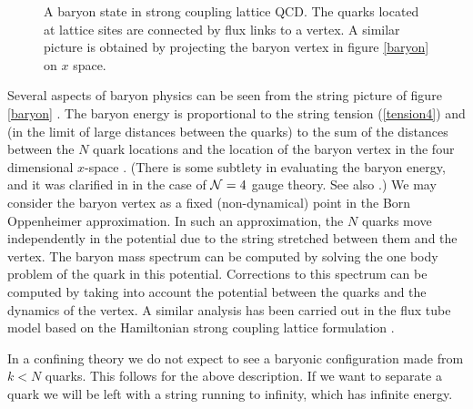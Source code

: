 \begin{figure}[htb]
\begin{center}
\epsfxsize=2in\leavevmode{}
\end{center}
\caption{A baryon state in strong coupling lattice QCD.
The quarks located at lattice sites 
are connected by flux links to a vertex. A similar picture is obtained
by projecting the baryon vertex in figure \ref{baryon} on $x$ space.}
\label{baryonlat}
\end{figure}

Several aspects of baryon physics can be seen from the string picture of
figure \ref{baryon} 
\cite{Witten:1998xy, Gross:1998gk}.
The baryon energy is proportional to the string tension (\ref{tension4})
and (in the limit of large distances between the quarks) to the sum of
the distances between the $N$ quark locations and the location of the
baryon vertex in the four dimensional $x$-space
\cite{Gross:1998gk,Brandhuber:1998xy,Imamura:1998hf}. 
(There is some subtlety
in evaluating the baryon energy, and it was clarified
in \cite{Imamura:1998gk} in the case of ${\cal N}=4$ gauge theory. 
See also \cite{Callan:1998iq,Callan:1999zf}.)  
We may consider the baryon vertex 
as a fixed (non-dynamical) point in the Born Oppenheimer
approximation. In such an approximation, the $N$ quarks move
independently in the potential due to the string stretched between
them and the vertex.  The baryon mass spectrum can be computed by
solving the one body problem of the quark in this potential.
Corrections to this spectrum can be computed by taking into account
the potential between the quarks and the dynamics of the vertex.  A
similar analysis has been carried out in the flux tube model
\cite{Isgur:1985fs} based on the Hamiltonian strong coupling lattice
formulation \cite{Kogut:1975xx}.


In a confining theory we do not expect to see a baryonic configuration
made from $k < N$ quarks. This follows for the above description. If
we want to separate a quark we will be left with a string running to 
infinity, which has infinite energy.
%


